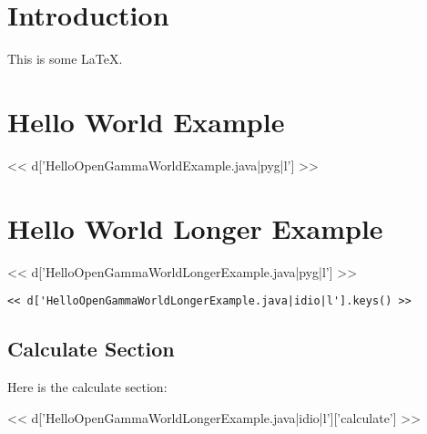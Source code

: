 \section{Introduction}

This is some \LaTeX.

\section{Hello World Example}

<< d['HelloOpenGammaWorldExample.java|pyg|l'] >>

\section{Hello World Longer Example}

<< d['HelloOpenGammaWorldLongerExample.java|pyg|l'] >>

\begin{Verbatim}
<< d['HelloOpenGammaWorldLongerExample.java|idio|l'].keys() >>
\end{Verbatim}

\subsection{Calculate Section}

Here is the calculate section:

<< d['HelloOpenGammaWorldLongerExample.java|idio|l']['calculate'] >>

